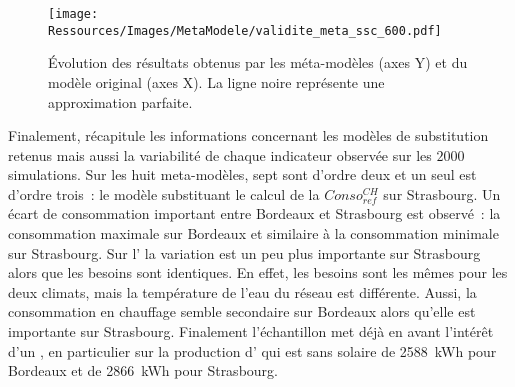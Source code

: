 \begin{figure}
    \centering
    \texttt{[image: Ressources/Images/MetaModele/validite\_meta\_ssc\_600.pdf]}
    \caption[Évaluation de la précision des méta-modèles pour les solutions de l’échantillon]
            {Évolution des résultats obtenus par les méta-modèles (axes Y) et du modèle
             original (axes X). La ligne noire représente une approximation parfaite.}
    \label{fig:validite_meta_ssc}
\end{figure}

Finalement,  récapitule les informations concernant les modèles
de substitution retenus mais aussi la variabilité de chaque indicateur observée sur les
$2000$ simulations. Sur les huit meta-modèles, sept sont d’ordre deux et un seul est d’ordre
trois~: le modèle substituant le calcul de la $Conso_{ref}^{CH}$ sur Strasbourg. Un écart de
consommation important entre Bordeaux et Strasbourg est observé~: la
consommation maximale sur Bordeaux et similaire à la consommation minimale sur Strasbourg.
Sur l’ la variation est un peu plus importante sur Strasbourg alors que les
besoins sont identiques. En effet, les besoins sont les mêmes pour les deux climats, mais
la température de l’eau du réseau est différente. Aussi, la consommation
en chauffage semble secondaire sur Bordeaux alors qu’elle est importante sur Strasbourg.
Finalement l’échantillon met déjà en avant l’intérêt d’un , en particulier sur
la production d’ qui est sans solaire de \SI{2588}{kWh} pour Bordeaux
et de \SI{2866}{kWh} pour Strasbourg.

